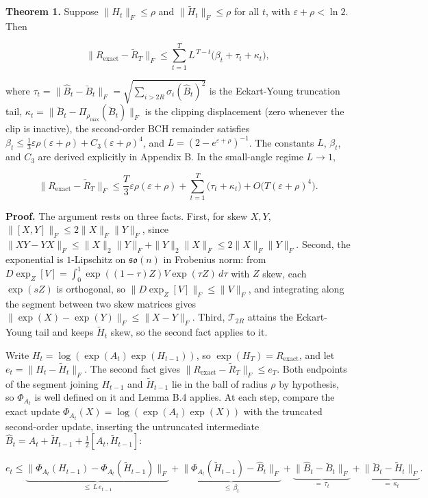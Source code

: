 \documentclass[
]{article}
\begin{document}
\textbf{Theorem 1.} Suppose \(\|H_t\|_F\leq\rho\) and \(\|\tilde{H}_t\|_F\leq\rho\) for all \(t\), with \(\varepsilon+\rho<\ln 2\). Then

\[
\|R_{\mathrm{exact}}-\tilde{R}_T\|_F\leq\sum_{t=1}^{T}L^{\,T-t}\big(\beta_t+\tau_t+\kappa_t\big),
\]

where \(\tau_t=\|\hat{B}_t-\breve{B}_t\|_F=\sqrt{\sum_{i>2R}\sigma_i(\hat{B}_t)^2}\) is the Eckart-Young truncation tail, \(\kappa_t=\|\breve{B}_t-\Pi_{\rho_{\max}}(\breve{B}_t)\|_F\) is the clipping displacement (zero whenever the clip is inactive), the second-order BCH remainder satisfies \(\beta_t\leq\tfrac{1}{3}\varepsilon\rho(\varepsilon+\rho)+C_3(\varepsilon+\rho)^4\), and \(L=(2-e^{\varepsilon+\rho})^{-1}\). The constants \(L\), \(\beta_t\), and \(C_3\) are derived explicitly in Appendix B. In the small-angle regime \(L\to 1\),

\[
\|R_{\mathrm{exact}}-\tilde{R}_T\|_F\leq\frac{T}{3}\varepsilon\rho(\varepsilon+\rho)+\sum_{t=1}^{T}\big(\tau_t+\kappa_t\big)+O\!\big(T(\varepsilon+\rho)^4\big).
\]

\textbf{Proof.} The argument rests on three facts. First, for skew \(X,Y\), \(\|[X,Y]\|_F\leq 2\|X\|_F\|Y\|_F\), since \(\|XY-YX\|_F\leq\|X\|_2\|Y\|_F+\|Y\|_2\|X\|_F\leq 2\|X\|_F\|Y\|_F\). Second, the exponential is \(1\)-Lipschitz on \(\mathfrak{so}(n)\) in Frobenius norm: from \(D\exp_Z[V]=\int_0^1\exp((1-\tau)Z)V\exp(\tau Z)\,d\tau\) with \(Z\) skew, each \(\exp(sZ)\) is orthogonal, so \(\|D\exp_Z[V]\|_F\leq\|V\|_F\), and integrating along the segment between two skew matrices gives \(\|\exp(X)-\exp(Y)\|_F\leq\|X-Y\|_F\). Third, \(\mathcal{T}_{2R}\) attains the Eckart-Young tail and keeps \(\tilde{H}_t\) skew, so the second fact applies to it.

Write \(H_t=\log(\exp(A_t)\exp(H_{t-1}))\), so \(\exp(H_T)=R_{\mathrm{exact}}\), and let \(e_t=\|H_t-\tilde{H}_t\|_F\). The second fact gives \(\|R_{\mathrm{exact}}-\tilde{R}_T\|_F\leq e_T\). Both endpoints of the segment joining \(H_{t-1}\) and \(\tilde{H}_{t-1}\) lie in the ball of radius \(\rho\) by hypothesis, so \(\Phi_{A_t}\) is well defined on it and Lemma B.4 applies. At each step, compare the exact update \(\Phi_{A_t}(X)=\log(\exp(A_t)\exp(X))\) with the truncated second-order update, inserting the untruncated intermediate \(\hat{B}_t=A_t+\tilde{H}_{t-1}+\tfrac{1}{2}[A_t,\tilde{H}_{t-1}]\):

\[
e_t\leq\underbrace{\|\Phi_{A_t}(H_{t-1})-\Phi_{A_t}(\tilde{H}_{t-1})\|_F}_{\leq\, L\,e_{t-1}}+\underbrace{\|\Phi_{A_t}(\tilde{H}_{t-1})-\hat{B}_t\|_F}_{\leq\,\beta_t}+\underbrace{\|\hat{B}_t-\breve{B}_t\|_F}_{=\,\tau_t}+\underbrace{\|\breve{B}_t-\tilde{H}_t\|_F}_{=\,\kappa_t}.
\]
\end{document}
